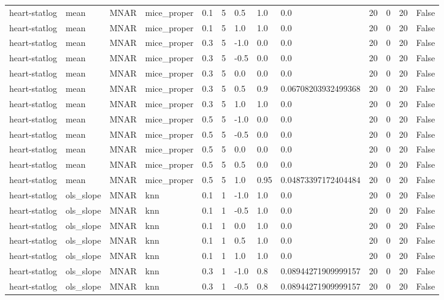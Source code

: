 \begin{tabular}{lllllllllllll}
heart-statlog & mean & MNAR & mice\_proper & 0.1 & 5 & 0.5 & 1.0 & 0.0 & 20 & 0 & 20 & False \\
heart-statlog & mean & MNAR & mice\_proper & 0.1 & 5 & 1.0 & 1.0 & 0.0 & 20 & 0 & 20 & False \\
heart-statlog & mean & MNAR & mice\_proper & 0.3 & 5 & -1.0 & 0.0 & 0.0 & 20 & 0 & 20 & False \\
heart-statlog & mean & MNAR & mice\_proper & 0.3 & 5 & -0.5 & 0.0 & 0.0 & 20 & 0 & 20 & False \\
heart-statlog & mean & MNAR & mice\_proper & 0.3 & 5 & 0.0 & 0.0 & 0.0 & 20 & 0 & 20 & False \\
heart-statlog & mean & MNAR & mice\_proper & 0.3 & 5 & 0.5 & 0.9 & 0.06708203932499368 & 20 & 0 & 20 & False \\
heart-statlog & mean & MNAR & mice\_proper & 0.3 & 5 & 1.0 & 1.0 & 0.0 & 20 & 0 & 20 & False \\
heart-statlog & mean & MNAR & mice\_proper & 0.5 & 5 & -1.0 & 0.0 & 0.0 & 20 & 0 & 20 & False \\
heart-statlog & mean & MNAR & mice\_proper & 0.5 & 5 & -0.5 & 0.0 & 0.0 & 20 & 0 & 20 & False \\
heart-statlog & mean & MNAR & mice\_proper & 0.5 & 5 & 0.0 & 0.0 & 0.0 & 20 & 0 & 20 & False \\
heart-statlog & mean & MNAR & mice\_proper & 0.5 & 5 & 0.5 & 0.0 & 0.0 & 20 & 0 & 20 & False \\
heart-statlog & mean & MNAR & mice\_proper & 0.5 & 5 & 1.0 & 0.95 & 0.04873397172404484 & 20 & 0 & 20 & False \\
heart-statlog & ols\_slope & MNAR & knn & 0.1 & 1 & -1.0 & 1.0 & 0.0 & 20 & 0 & 20 & False \\
heart-statlog & ols\_slope & MNAR & knn & 0.1 & 1 & -0.5 & 1.0 & 0.0 & 20 & 0 & 20 & False \\
heart-statlog & ols\_slope & MNAR & knn & 0.1 & 1 & 0.0 & 1.0 & 0.0 & 20 & 0 & 20 & False \\
heart-statlog & ols\_slope & MNAR & knn & 0.1 & 1 & 0.5 & 1.0 & 0.0 & 20 & 0 & 20 & False \\
heart-statlog & ols\_slope & MNAR & knn & 0.1 & 1 & 1.0 & 1.0 & 0.0 & 20 & 0 & 20 & False \\
heart-statlog & ols\_slope & MNAR & knn & 0.3 & 1 & -1.0 & 0.8 & 0.08944271909999157 & 20 & 0 & 20 & False \\
heart-statlog & ols\_slope & MNAR & knn & 0.3 & 1 & -0.5 & 0.8 & 0.08944271909999157 & 20 & 0 & 20 & False \\

\end{tabular}
